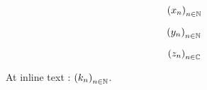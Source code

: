 \documentclass{article}
\newcommand{\xinN}[2][N]{%
		\ensuremath{%
			\left( #2_n \right)_{n \in \mathbb{#1}}%
		}%
	}
\begin{document}
\begin{equation}
	\xinN{x}
\end{equation}

\begin{equation}
	\xinN{y}
\end{equation}

\begin{equation}
	\xinN[C]{z}
\end{equation}

At inline text : $\xinN{k}$.
\end{document}
